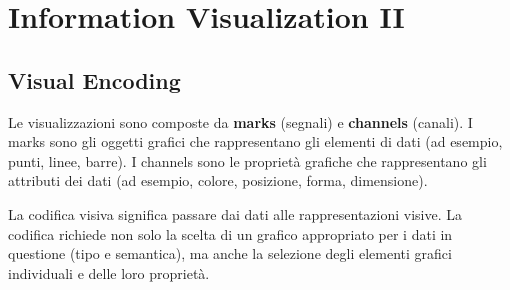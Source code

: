 \section{Information Visualization II}
\subsection{Visual Encoding}
Le visualizzazioni sono composte da \textbf{marks} (segnali) e 
\textbf{channels} (canali). I marks sono gli oggetti grafici che rappresentano gli elementi di dati (ad esempio, punti, linee, barre).
I channels sono le proprietà grafiche che rappresentano gli attributi dei dati (ad esempio, colore, posizione, forma, dimensione).


La codifica visiva significa passare dai dati alle rappresentazioni visive.
La codifica richiede non solo la scelta di un grafico appropriato per i dati in questione (tipo e semantica),
ma anche la selezione degli elementi grafici individuali e delle loro proprietà.

